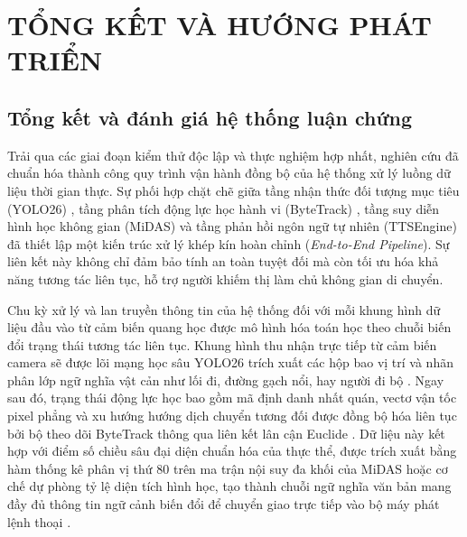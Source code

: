 \chapter{TỔNG KẾT VÀ HƯỚNG PHÁT TRIỂN} %

\label{Chapter5} %


\renewcommand{\keyword}[1]{\textbf{#1}}
\renewcommand{\tabhead}[1]{\textbf{#1}}
\renewcommand{\code}[1]{\texttt{#1}}
\renewcommand{\file}[1]{\texttt{\bfseries#1}}
\renewcommand{\option}[1]{\texttt{\itshape#1}}
\setcounter{secnumdepth}{3} 

\section{Tổng kết và đánh giá hệ thống luận chứng}

Trải qua các giai đoạn kiểm thử độc lập và thực nghiệm hợp nhất, nghiên cứu đã chuẩn hóa thành công quy trình vận hành đồng bộ của hệ thống xử lý luồng dữ liệu thời gian thực. Sự phối hợp chặt chẽ giữa tầng nhận thức đối tượng mục tiêu (YOLO26) \cite{Reference3}, tầng phân tích động lực học hành vi (ByteTrack) \cite{Reference12}, tầng suy diễn hình học không gian (MiDAS) \cite{Reference11} và tầng phản hồi ngôn ngữ tự nhiên (TTSEngine) đã thiết lập một kiến trúc xử lý khép kín hoàn chỉnh (\textit{End-to-End Pipeline}). Sự liên kết này không chỉ đảm bảo tính an toàn tuyệt đối mà còn tối ưu hóa khả năng tương tác liên tục, hỗ trợ người khiếm thị làm chủ không gian di chuyển.

Chu kỳ xử lý và lan truyền thông tin của hệ thống đối với mỗi khung hình dữ liệu đầu vào từ cảm biến quang học được mô hình hóa toán học theo chuỗi biến đổi trạng thái tương tác liên tục. Khung hình thu nhận trực tiếp từ cảm biến camera sẽ được lõi mạng học sâu YOLO26 trích xuất các hộp bao vị trí và nhãn phân lớp ngữ nghĩa vật cản như lối đi, đường gạch nổi, hay người đi bộ \cite{Reference3}. Ngay sau đó, trạng thái động lực học bao gồm mã định danh nhất quán, vectơ vận tốc pixel phẳng và xu hướng hướng dịch chuyển tương đối được đồng bộ hóa liên tục bởi bộ theo dõi ByteTrack thông qua liên kết lân cận Euclide \cite{Reference12}. Dữ liệu này kết hợp với điểm số chiều sâu đại diện chuẩn hóa của thực thể, được trích xuất bằng hàm thống kê phân vị thứ 80 trên ma trận nội suy đa khối của MiDAS hoặc cơ chế dự phòng tỷ lệ diện tích hình học, tạo thành chuỗi ngữ nghĩa văn bản mang đầy đủ thông tin ngữ cảnh biến đổi để chuyển giao trực tiếp vào bộ máy phát lệnh thoại \cite{Reference11}.

